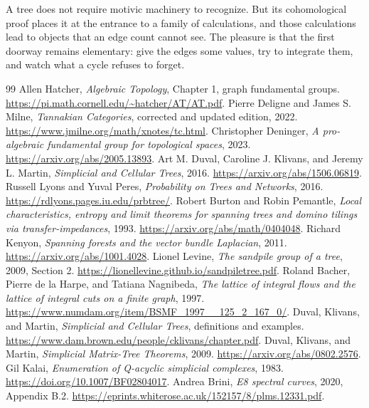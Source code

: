 \documentclass[11pt]{article}
\theoremstyle{definition}
\theoremstyle{remark}
\begin{document}
A tree does not require motivic machinery to recognize. But its cohomological proof places it at the entrance to a family of calculations, and those calculations lead to objects that an edge count cannot see. The pleasure is that the first doorway remains elementary: give the edges some values, try to integrate them, and watch what a cycle refuses to forget.


\begin{thebibliography}{99}
 Allen Hatcher, \emph{Algebraic Topology}, Chapter 1, graph fundamental groups. \url{https://pi.math.cornell.edu/~hatcher/AT/AT.pdf}.
 Pierre Deligne and James S. Milne, \emph{Tannakian Categories}, corrected and updated edition, 2022. \url{https://www.jmilne.org/math/xnotes/tc.html}.
 Christopher Deninger, \emph{A pro-algebraic fundamental group for topological spaces}, 2023. \url{https://arxiv.org/abs/2005.13893}.
 Art M. Duval, Caroline J. Klivans, and Jeremy L. Martin, \emph{Simplicial and Cellular Trees}, 2016. \url{https://arxiv.org/abs/1506.06819}.
 Russell Lyons and Yuval Peres, \emph{Probability on Trees and Networks}, 2016. \url{https://rdlyons.pages.iu.edu/prbtree/}.
 Robert Burton and Robin Pemantle, \emph{Local characteristics, entropy and limit theorems for spanning trees and domino tilings via transfer-impedances}, 1993. \url{https://arxiv.org/abs/math/0404048}.
 Richard Kenyon, \emph{Spanning forests and the vector bundle Laplacian}, 2011. \url{https://arxiv.org/abs/1001.4028}.
 Lionel Levine, \emph{The sandpile group of a tree}, 2009, Section 2. \url{https://lionellevine.github.io/sandpiletree.pdf}.
 Roland Bacher, Pierre de la Harpe, and Tatiana Nagnibeda, \emph{The lattice of integral flows and the lattice of integral cuts on a finite graph}, 1997. \url{https://www.numdam.org/item/BSMF_1997__125_2_167_0/}.
 Duval, Klivans, and Martin, \emph{Simplicial and Cellular Trees}, definitions and examples. \url{https://www.dam.brown.edu/people/cklivans/chapter.pdf}.
 Duval, Klivans, and Martin, \emph{Simplicial Matrix-Tree Theorems}, 2009. \url{https://arxiv.org/abs/0802.2576}.
 Gil Kalai, \emph{Enumeration of Q-acyclic simplicial complexes}, 1983. \url{https://doi.org/10.1007/BF02804017}.
 Andrea Brini, \emph{E8 spectral curves}, 2020, Appendix B.2. \url{https://eprints.whiterose.ac.uk/152157/8/plms.12331.pdf}.

\end{thebibliography}
\end{document}
